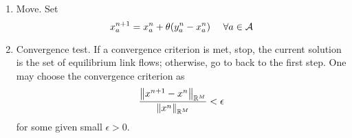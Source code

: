 \documentclass{article}
\begin{document}
\begin{enumerate}[start=0, label={\bfseries Step \arabic*}]
    \item Move. Set
    \begin{equation*}
        x^{n+1}_a = x^n_a + \theta(y^n_a-x^n_a) ~~~~ \forall a \in \mathcal{A}
    \end{equation*}

    \item Convergence test. If a convergence criterion is met, stop, the current solution is the set of equilibrium link flows; otherwise, go to back to the first step. One may choose the convergence criterion as
    \begin{equation*}
        \frac{\norm{x^{n+1}-x^n}_{\mathbb{R}^M}}{\norm{x^n}_{\mathbb{R}^M}} < \epsilon
    \end{equation*}
    for some given small $ \epsilon > 0 $.

\end{enumerate}

\printbibliography
\end{document}
